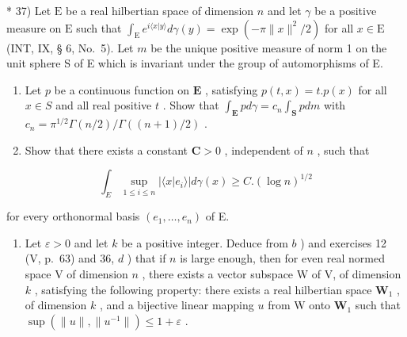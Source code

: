 * 37) Let \(\mathrm{E}\) be a real hilbertian space of dimension \(n\) and let \(\gamma\) be a positive measure on \(\mathrm{E}\) such that \(\int_{\mathrm{E}} e^{i\langle x|y\rangle} d\gamma(y) = \exp(-\pi \|x\|^2/2)\) for all \(x \in \mathrm{E}\) (INT, IX, § 6, No.~5). Let \(m\) be the unique positive measure of norm 1 on the unit sphere S of E which is invariant under the group of automorphisms of E.

\begin{enumerate}
\def\labelenumi{\alph{enumi})}
\item
  Let \(p\) be a continuous function on \(\mathbf{E}\) , satisfying \(p(t,x) = t.p(x)\) for all \(x\in S\) and all real positive \(t\) . Show that \(\int_{\mathbf{E}}pd\gamma = c_n\int_{\mathbf{S}}pdm\) with \(c_{n} = \pi^{1 / 2}\Gamma (n / 2) / \Gamma ((n + 1) / 2)\) .
\item
  Show that there exists a constant \(\mathbf{C} > 0\) , independent of \(n\) , such that
\end{enumerate}

\[
\int_ {E} \sup _ {1 \leqslant i \leqslant n} | \langle x | e _ {i} \rangle | d \gamma (x) \geqslant C. (\log n) ^ {1 / 2}
\]

for every orthonormal basis \((e_1, \dots, e_n)\) of E.

\begin{enumerate}
\def\labelenumi{\alph{enumi})}
\setcounter{enumi}{2}
\tightlist
\item
  Let \(\varepsilon > 0\) and let \(k\) be a positive integer. Deduce from \(b\) ) and exercises 12 (V, p.~63) and 36, \(d\) ) that if \(n\) is large enough, then for even real normed space V of dimension \(n\) , there exists a vector subspace W of V, of dimension \(k\) , satisfying the following property: there exists a real hilbertian space \(\mathbf{W}_1\) , of dimension \(k\) , and a bijective linear mapping \(u\) from W onto \(\mathbf{W}_1\) such that \(\sup (\| u \|, \| u^{-1} \|) \leqslant 1 + \varepsilon\) .
\end{enumerate}

